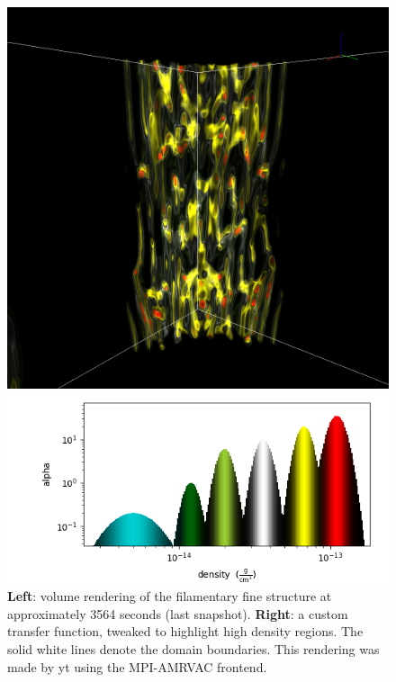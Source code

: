 \begin{figure}[t]
  \begin{minipage}{0.5\textwidth}
    \centering
    \includegraphics[width=\textwidth]{3d_volume_rendering.png}
  \end{minipage}
  \begin{minipage}{0.49\textwidth}
    \centering
    \includegraphics[width=\textwidth]{3d_transfer_function.png}
  \end{minipage}
  \caption{
    \textbf{Left}: volume rendering of the filamentary fine structure at approximately 3564 seconds (last snapshot).
    \textbf{Right}: a custom transfer function, tweaked to highlight high density regions. The solid white lines denote the domain boundaries. This rendering was made by \textsf{yt} \citep{turk2011} using the MPI-AMRVAC frontend.
  }
  \label{fig: 3d_volume_rendering}
\end{figure}

